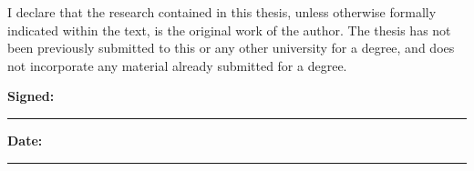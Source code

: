 
I declare that the research contained in this thesis, unless otherwise formally
indicated within the text, is the original work of the author. The thesis has not
been previously submitted to this or any other university for a degree, and does
not incorporate any material already submitted for a degree.

\vspace{15mm}
\textbf{Signed:}\ \rule{90mm}{0.4pt}

\vspace{15mm}
\textbf{Date:}\ \rule{98mm}{0.4pt}

